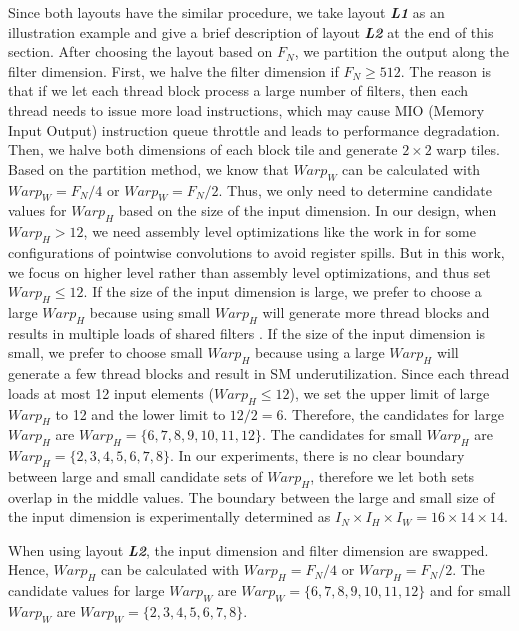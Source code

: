 Since both layouts have the similar procedure, we take layout \textbf{\emph{L1}} as an illustration example and give a brief description of layout \textbf{\emph{L2}} at the end of this section.
After choosing the layout based on $F_N$, we partition the output along the filter dimension.
First, we halve the filter dimension if $F_N \geq 512$.
The reason is that if we let each thread block process a large number of filters, then each thread needs to issue more load instructions, which may cause MIO (Memory Input Output) instruction queue throttle and leads to performance degradation.
Then, we halve both dimensions of each block tile and generate $2 \times 2$ warp tiles.
Based on the partition method, we know that $Warp_W$ can be calculated with $Warp_W=F_N/4$ or $Warp_W=F_N/2$. Thus, we only need to determine candidate values for $Warp_H$ based on the size of the input dimension.
In our design, when $Warp_H > 12$, we need assembly level optimizations like the work in
\cite{yan2020optimizing,yan2020demystifying} for some configurations of pointwise convolutions to avoid register spills. But in this work,
we focus on higher level rather than assembly level optimizations, and thus set $Warp_H \leq 12$.
If the size of the input dimension is large, we prefer to choose a large $Warp_H$ because using small $Warp_H$ will generate more thread blocks and results in multiple loads of shared filters \cite{jia2020enabling, zheng2020flextensor}.
If the size of the input dimension is small, we prefer to choose small $Warp_H$ because using a large $Warp_H$ will generate a few thread blocks and result in SM underutilization.
Since each thread loads at most 12 input elements ($Warp_H \leq 12$), we set the upper limit of large $Warp_H$ to 12 and the lower limit to $12/2=6$.
Therefore, the candidates for large $Warp_H$ are $Warp_H=\{6,7,8,9,10,11,12\}$.
The candidates for small $Warp_H$ are $Warp_H=\{2,3,4,5,6,7,8\}$.
In our experiments, there is no clear boundary between large and small candidate sets of $Warp_H$, therefore we let both sets overlap in the middle values.
The boundary between the large and small size of the input dimension is experimentally determined as $I_N \times I_H \times I_W=16 \times 14 \times 14$.

When using layout \textbf{\emph{L2}}, the input dimension and filter dimension are swapped. Hence, $Warp_H$ can be calculated with $Warp_H=F_N/4$ or $Warp_H=F_N/2$. The candidate values for large $Warp_W$ are $Warp_W=\{6,7,8,9,10,11,12\}$ and for small $Warp_W$ are $Warp_W=\{2,3,4,5,6,7,8\}$.

